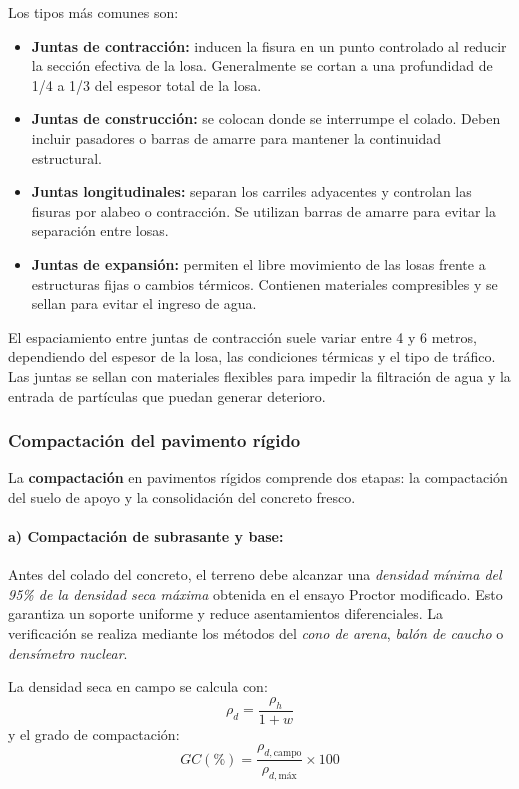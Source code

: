 \documentclass[12pt]{article}
\begin{document}
Los tipos más comunes son:
\begin{itemize}
	\item \textbf{Juntas de contracción:} inducen la fisura en un punto controlado al reducir la sección efectiva de la losa. Generalmente se cortan a una profundidad de 1/4 a 1/3 del espesor total de la losa.
	\item \textbf{Juntas de construcción:} se colocan donde se interrumpe el colado. Deben incluir pasadores o barras de amarre para mantener la continuidad estructural.
	\item \textbf{Juntas longitudinales:} separan los carriles adyacentes y controlan las fisuras por alabeo o contracción. Se utilizan barras de amarre para evitar la separación entre losas.
	\item \textbf{Juntas de expansión:} permiten el libre movimiento de las losas frente a estructuras fijas o cambios térmicos. Contienen materiales compresibles y se sellan para evitar el ingreso de agua.
\end{itemize}

El espaciamiento entre juntas de contracción suele variar entre 4 y 6 metros, dependiendo del espesor de la losa, las condiciones térmicas y el tipo de tráfico. Las juntas se sellan con materiales flexibles para impedir la filtración de agua y la entrada de partículas que puedan generar deterioro.

\subsubsection{Compactación del pavimento rígido}
La \textbf{compactación} en pavimentos rígidos comprende dos etapas: la compactación del suelo de apoyo y la consolidación del concreto fresco.

\paragraph{a) Compactación de subrasante y base:}
Antes del colado del concreto, el terreno debe alcanzar una \textit{densidad mínima del 95\% de la densidad seca máxima} obtenida en el ensayo Proctor modificado. Esto garantiza un soporte uniforme y reduce asentamientos diferenciales. La verificación se realiza mediante los métodos del \textit{cono de arena}, \textit{balón de caucho} o \textit{densímetro nuclear}.  

La densidad seca en campo se calcula con:
\[
\rho_d = \frac{\rho_h}{1+w}
\]
y el grado de compactación:
\[
GC(\%) = \frac{\rho_{d,\text{campo}}}{\rho_{d,\text{máx}}} \times 100
\]
\end{document}
